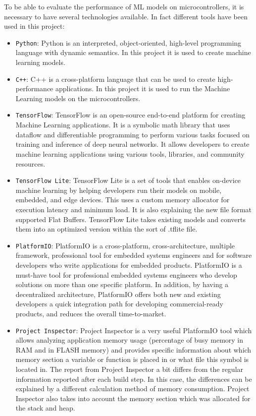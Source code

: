 \documentclass{article}
\begin{document}
To be able to evaluate the performance of ML models on microcontrollers, it is necessary to have several technologies available. In fact different tools have been used in this project:

\begin{itemize}
    \item \texttt{Python}: Python is an interpreted, object-oriented, high-level programming language with dynamic semantics. In this project it is used to create machine learning models.
    \item \texttt{C++}: C++ is a cross-platform language that can be used to create high-performance applications. In this project it is used to run the Machine Learning models on the microcontrollers.
    \item \texttt{TensorFlow}: TensorFlow is an open-source end-to-end platform for creating Machine Learning applications. It is a symbolic math library that uses dataflow and differentiable programming to perform various tasks focused on training and inference of deep neural networks. It allows developers to create machine learning applications using various tools, libraries, and community resources.
    \item \texttt{TensorFlow Lite}: TensorFlow Lite is a set of tools that enables on-device machine learning by helping developers run their models on mobile, embedded, and edge devices. This uses a custom memory allocator for execution latency and minimum load. It is also explaining the new file format supported Flat Buffers. TensorFlow Lite takes existing models and converts them into an optimized version within the sort of .tflite file.
    \item \texttt{PlatformIO}: PlatformIO is a cross-platform, cross-architecture, multiple framework, professional tool for embedded systems engineers and for software developers who write applications for embedded products. PlatformIO is a must-have tool for professional embedded systems engineers who develop solutions on more than one specific platform. In addition, by having a decentralized architecture, PlatformIO offers both new and existing developers a quick integration path for developing commercial-ready products, and reduces the overall time-to-market.
    \item \texttt{Project Inspector}: Project Inspector is a very useful PlatformIO tool which allows analyzing application memory usage (percentage of busy memory in RAM and in FLASH memory) and provides specific information about which memory section a variable or function is placed in or what file this symbol is located in. The report from Project Inspector a bit differs from the regular information reported after each build step. In this case, the differences can be explained by a different calculation method of memory consumption. Project Inspector also takes into account the memory section which was allocated for the stack and heap.

\end{itemize}
\end{document}
